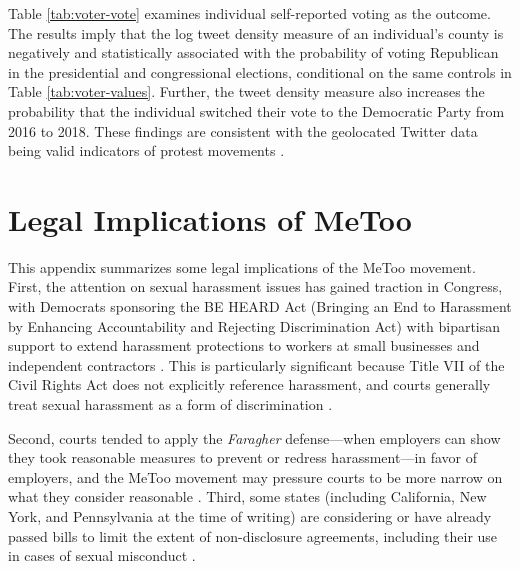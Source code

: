 \documentclass[manuscript,screen,nonacm,11pt,acm]{acmart}
\begin{document}
\begin{bibunit}
Table \ref{tab:voter-vote} examines individual self-reported voting as the outcome.
The results imply that the log tweet density measure of an individual's county is negatively and statistically associated with the probability of voting Republican in the presidential and congressional elections, conditional on the same controls in Table \ref{tab:voter-values}.
Further, the tweet density measure also increases the probability that the individual switched their vote to the Democratic Party from 2016 to 2018.
These findings are consistent with the geolocated Twitter data being valid indicators of protest movements \citep[e.g.,]{sobolev2020}.

\clearpage
\FloatBarrier
\section{Legal Implications of MeToo}\label{sm:legal}
This appendix summarizes some legal implications of the MeToo movement.
First, the attention on sexual harassment issues has gained traction in Congress, with Democrats sponsoring the BE HEARD Act (Bringing an End to Harassment by Enhancing Accountability and Rejecting Discrimination Act) with bipartisan support to extend harassment protections to workers at small businesses and independent contractors \citep{vox2019}.
This is particularly significant because Title VII of the Civil Rights Act does not explicitly reference harassment, and courts generally treat sexual harassment as a form of discrimination \citep{Tippett2018}.

Second, courts tended to apply the \emph{Faragher} defense---when employers can show they took reasonable measures to prevent or redress harassment---in favor of employers, and the MeToo movement may pressure courts to be more narrow on what they consider reasonable \citep{Tippett2018}.
Third, some states (including California, New York, and Pennsylvania at the time of writing) are considering or have already passed bills to limit the extent of non-disclosure agreements, including their use in cases of sexual misconduct \citep{Tippett2018}. 


\end{bibunit}
\end{document}
